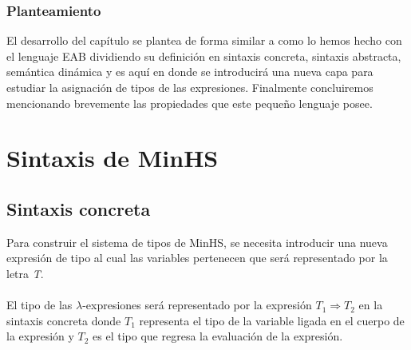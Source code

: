 \subsubsection{Planteamiento}
El desarrollo del capítulo se plantea de forma similar a como lo hemos hecho con el lenguaje \textsf{EAB} dividiendo su definición en sintaxis concreta, sintaxis abstracta, semántica dinámica y es aquí en donde se introducirá una nueva capa para estudiar la asignación de tipos de las expresiones. Finalmente concluiremos mencionando brevemente las propiedades que este pequeño lenguaje posee. \\

\section{Sintaxis de \textsf{MinHS}}

\subsection{Sintaxis concreta}
    Para construir el sistema de tipos de \textsf{MinHS}, se necesita introducir una nueva expresión de tipo al cual las variables pertenecen que será representado por la letra \textit{T}.\\\\    
     El tipo de las $\lambda$-expresiones  será representado por la expresión $T_1 \Rightarrow T_2$ en la sintaxis concreta donde $T_1$ representa el tipo de la variable ligada en el cuerpo de la expresión  y $T_2$ es el tipo que regresa la evaluación de la expresión. 

\bigskip

